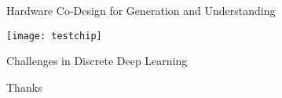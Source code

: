 \begin{frame}{Hardware Co-Design for Generation and Understanding}
\begin{center}
  \texttt{[image: testchip]}
\end{center}
\end{frame}

\begin{frame}{Challenges in Discrete Deep Learning}
  
\end{frame}




\begin{frame}
  Thanks
\end{frame}



\begin{frame}

\end{frame}